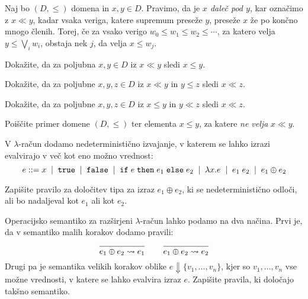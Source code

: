 \documentclass[arhiv]{izpit}
\begin{document}

\naloga[\tocke{20}]

Naj bo $(D, \leq)$ domena in $x, y \in D$. Pravimo, da je \emph{$x$ daleč pod $y$}, kar označimo z $x \ll y$, kadar vsaka veriga, katere supremum preseže $y$, preseže $x$ že po končno mnogo členih. Torej, če za vsako verigo $w_0 \leq w_1 \leq w_2 \leq \cdots$, za katero velja $y \leq \bigvee_i w_i$, obstaja nek $j$, da velja $x \leq w_j$.

\podnaloga
Dokažite, da za poljubna $x, y \in D$ iz $x \ll y$ sledi $x \leq y$.

\podnaloga
Dokažite, da za poljubne $x, y, z \in D$ iz $x \ll y$ in $y \leq z$ sledi $x \ll z$.

\podnaloga
Dokažite, da za poljubne $x, y, z \in D$ iz $x \leq y$ in $y \ll z$ sledi $x \ll z$.

\podnaloga
Poiščite primer domene $(D, \leq)$ ter elementa $x \leq y$, za katere \emph{ne velja} $x \ll y$.

\nadaljevanje


\naloga[\tocke{20}]
\newcommand{\amb}[2]{#1 \oplus #2}
V $\lambda$-račun dodamo nedeterministično izvajanje, v katerem se lahko izrazi evalvirajo v več kot eno možno vrednost:
\[
  e \bnfis
  x \bnfor
  \tru \bnfor
  \fls \bnfor
  \conditional{e}{e_1}{e_2} \bnfor
  \fun{x}{e} \bnfor
  e_1 \; e_2 \bnfor
  \amb{e_1}{e_2}
\]

\podnaloga
Zapišite pravilo za določitev tipa za izraz $\amb{e_1}{e_2}$, ki se nedeterministično odloči, ali bo nadaljeval kot $e_1$ ali kot $e_2$.

\podnaloga
Operacijsko semantiko za razširjeni $\lambda$-račun lahko podamo na dva načina. Prvi je, da v semantiko malih korakov dodamo pravili:
\[
\frac{
  \hbox{}
}{
  \amb{e_1}{e_2} \leadsto e_1
}
\qquad
\frac{
  \hbox{}
}{
  \amb{e_1}{e_2} \leadsto e_2
}
\]
Drugi pa je semantika velikih korakov oblike $e \Downarrow \{v_1, \dots, v_n\}$, kjer so $v_1, \dots, v_n$ vse možne vrednosti, v katere se lahko evalvira izraz $e$. Zapišite pravila, ki določajo takšno semantiko.

\nadaljevanje


\naloga[\tocke{20}]
\end{document}
